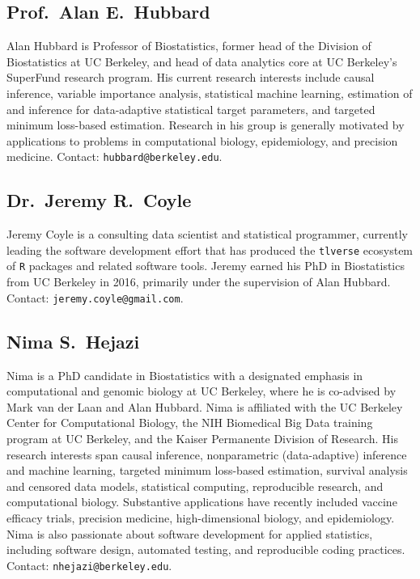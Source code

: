 \documentclass[a4paper,11pt]{texMemo}
\begin{document}
\subsection{Prof.~Alan E.~Hubbard}

Alan Hubbard is Professor of Biostatistics, former head of the Division of
Biostatistics at UC Berkeley, and head of data analytics core at UC Berkeley's
SuperFund research program. His current research interests include causal
inference, variable importance analysis, statistical machine learning,
estimation of and inference for data-adaptive statistical target parameters, and
targeted minimum loss-based estimation. Research in his group is generally
motivated by applications to problems in computational biology, epidemiology,
and precision medicine. Contact: \texttt{hubbard@berkeley.edu}.

\subsection{Dr.~Jeremy R.~Coyle}

Jeremy Coyle is a consulting data scientist and statistical programmer,
currently leading the software development effort that has produced the
\texttt{tlverse} ecosystem of \texttt{R} packages and related software tools.
Jeremy earned his PhD in Biostatistics from UC Berkeley in 2016, primarily under
the supervision of Alan Hubbard. Contact: \texttt{jeremy.coyle@gmail.com}.

\subsection{Nima S.~Hejazi}

Nima is a PhD candidate in Biostatistics with a designated emphasis in
computational and genomic biology at UC Berkeley, where he is co-advised by Mark
van der Laan and Alan Hubbard. Nima is affiliated with the UC Berkeley Center
for Computational Biology, the NIH Biomedical Big Data training program at UC
Berkeley, and the Kaiser Permanente Division of Research. His research interests
span causal inference, nonparametric (data-adaptive) inference and machine
learning, targeted minimum loss-based estimation, survival analysis and censored
data models, statistical computing, reproducible research, and computational
biology. Substantive applications have recently included vaccine efficacy
trials, precision medicine, high-dimensional biology, and epidemiology. Nima is
also passionate about software development for applied statistics, including
software design, automated testing, and reproducible coding practices. Contact:
\texttt{nhejazi@berkeley.edu}.
\end{document}

